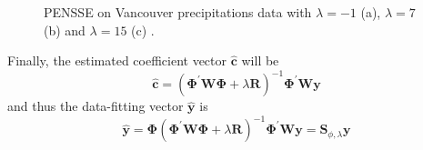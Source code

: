 \begin{figure}
    \centering
    \caption[PENSSE with different $\lambda$]{PENSSE on Vancouver precipitations data with $\lambda=-1$ (a), $\lambda=7$ (b) and $\lambda=15$ (c) \cite{ramsay_functional_2009}.}
    \label{fig:lambda}
\end{figure}
Finally, the estimated coefficient vector $\hat{\mathbf{c}}$ will be 
\begin{equation}
    \hat{\mathbf{c}}=\left(\boldsymbol{\Phi}^{\prime} \mathbf{W} \boldsymbol{\Phi}+\lambda \mathbf{R}\right)^{-1} \boldsymbol{\Phi}^{\prime} \mathbf{W} \mathbf{y}
\end{equation}
and thus the data-fitting vector $\mathbf{\hat{y}}$ is
\begin{equation}
    \label{eq:unbelcasino}
    \hat{\mathbf{y}}=\boldsymbol{\Phi}\left(\boldsymbol{\Phi}^{\prime} \mathbf{W} \boldsymbol{\Phi}+\lambda \mathbf{R}\right)^{-1} \boldsymbol{\Phi}^{\prime} \mathbf{W} \mathbf{y}=\mathbf{S}_{\phi, \lambda} \mathbf{y}
\end{equation}

